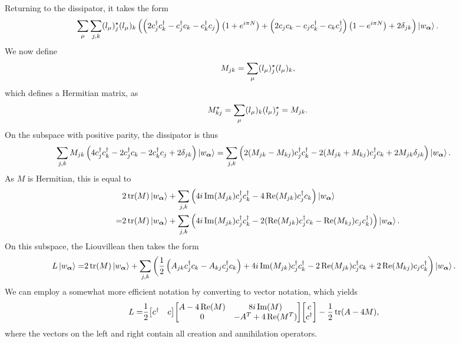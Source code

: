Returning to the dissipator, it takes the form
\begin{align*}
	\sum\limits_{\mu}\sum\limits_{j, k}(l_{\mu})_{j}^{\star}(l_{\mu})_{k}\left(\left(2c_{j}^{\dagger} c_{k}^{\dagger} - c_{j}^{\dagger} c_{k} - c_{k}^{\dagger} c_{j}\right)\left(1 + e^{i\pi N}\right) + \left(2c_{j}c_{k} - c_{j}c_{k}^{\dagger} - c_{k}c_{j}^{\dagger}\right)\left(1 - e^{i\pi N}\right) + 2\delta_{jk}\right)\ket{w_{\vb*{\alpha}}}.
\end{align*}
We now define
\begin{align*}
	M_{jk} = \sum\limits_{\mu}(l_{\mu})_{j}^{\star}(l_{\mu})_{k},
\end{align*}
which defines a Hermitian matrix, as
\begin{align*}
	M_{kj}^{\star} = \sum\limits_{\mu}(l_{\mu})_{k}(l_{\mu})_{j}^{\star} = M_{jk}.
\end{align*}
On the subspace with positive parity, the dissipator is thus
\begin{align*}
	\sum\limits_{j, k}M_{jk}\left(4c_{j}^{\dagger} c_{k}^{\dagger} - 2c_{j}^{\dagger} c_{k} - 2c_{k}^{\dagger} c_{j} + 2\delta_{jk}\right)\ket{w_{\vb*{\alpha}}} &= \sum\limits_{j, k}\left(2(M_{jk} - M_{kj})c_{j}^{\dagger} c_{k}^{\dagger} - 2(M_{jk} + M_{kj})c_{j}^{\dagger} c_{k} + 2M_{jk}\delta_{jk}\right)\ket{w_{\vb*{\alpha}}}.
\end{align*}
As $M$ is Hermitian, this is equal to
\begin{align*}
	&2\tr(M)\ket{w_{\vb*{\alpha}}} + \sum\limits_{j, k}\left(4i\Im(M_{jk})c_{j}^{\dagger} c_{k}^{\dagger} - 4\Re(M_{jk})c_{j}^{\dagger} c_{k}\right)\ket{w_{\vb*{\alpha}}} \\
	=& 2\tr(M)\ket{w_{\vb*{\alpha}}} + \sum\limits_{j, k}\left(4i\Im(M_{jk})c_{j}^{\dagger} c_{k}^{\dagger} - 2(\Re(M_{jk})c_{j}^{\dagger} c_{k} - \Re(M_{kj})c_{j}c_{k}^{\dagger})\right)\ket{w_{\vb*{\alpha}}}.
\end{align*}
On this subspace, the Liouvillean then takes the form
\begin{align*}
	L\ket{w_{\vb*{\alpha}}} =& 2\tr(M)\ket{w_{\vb*{\alpha}}} + \sum\limits_{j, k}\left(\frac{1}{2}\left(A_{jk}c_{j}^{\dagger} c_{k} - A_{kj}c_{j}^{\dagger} c_{k}\right) + 4i\Im(M_{jk})c_{j}^{\dagger} c_{k}^{\dagger} - 2\Re(M_{jk})c_{j}^{\dagger} c_{k} + 2\Re(M_{kj})c_{j}c_{k}^{\dagger}\right)\ket{w_{\vb*{\alpha}}}.
\end{align*}
We can employ a somewhat more efficient notation by converting to vector notation, which yields
\begin{align*}
	L =& \frac{1}{2}\mqty[
		c\adj & c
	]\mqty[
		A - 4\Re(M) & 8i\Im(M) \\
		0           & -A^{T} + 4\Re(M^{T})
	]\mqty[
		c \\
		c\adj
	] - \frac{1}{2}\tr(A - 4M),
\end{align*}
where the vectors on the left and right contain all creation and annihilation operators.


